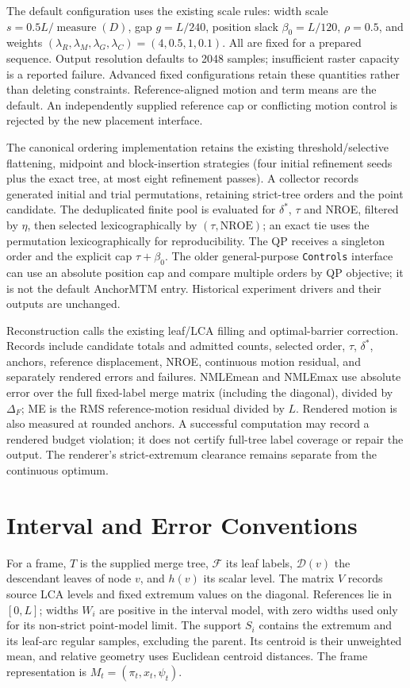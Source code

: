 \documentclass{vgtc}                %
\begin{document}
The default configuration uses the existing scale rules: width scale $s=0.5L/\operatorname{measure}(D)$, gap $g=L/240$, position slack $\beta_0=L/120$, $\rho=0.5$, and weights $(\lambda_R,\lambda_M,\lambda_G,\lambda_C)=(4,0.5,1,0.1)$. All are fixed for a prepared sequence. Output resolution defaults to 2048 samples; insufficient raster capacity is a reported failure. Advanced fixed configurations retain these quantities rather than deleting constraints. Reference-aligned motion and term means are the default. An independently supplied reference cap or conflicting motion control is rejected by the new placement interface.

The canonical ordering implementation retains the existing threshold/selective flattening, midpoint and block-insertion strategies (four initial refinement seeds plus the exact tree, at most eight refinement passes). A collector records generated initial and trial permutations, retaining strict-tree orders and the point candidate. The deduplicated finite pool is evaluated for $\delta^*$, $\tau$ and NROE, filtered by $\eta$, then selected lexicographically by $(\tau,\mathrm{NROE})$; an exact tie uses the permutation lexicographically for reproducibility. The QP receives a singleton order and the explicit cap $\tau+\beta_0$. The older general-purpose \texttt{Controls} interface can use an absolute position cap and compare multiple orders by QP objective; it is not the default AnchorMTM entry. Historical experiment drivers and their outputs are unchanged.

Reconstruction calls the existing leaf/LCA filling and optimal-barrier correction. Records include candidate totals and admitted counts, selected order, $\tau$, $\delta^*$, anchors, reference displacement, NROE, continuous motion residual, and separately rendered errors and failures. NMLEmean and NMLEmax use absolute error over the full fixed-label merge matrix (including the diagonal), divided by $\Delta_F$; ME is the RMS reference-motion residual divided by $L$. Rendered motion is also measured at rounded anchors. A successful computation may record a rendered budget violation; it does not certify full-tree label coverage or repair the output. The renderer's strict-extremum clearance remains separate from the continuous optimum.

\section{Interval and Error Conventions}\label{sec:interval}
For a frame, $T$ is the supplied merge tree, $\mathcal{F}$ its leaf labels, $\mathcal{D}(v)$ the descendant leaves of node $v$, and $h(v)$ its scalar level. The matrix $V$ records source LCA levels and fixed extremum values on the diagonal. References lie in $[0,L]$; widths $W_i$ are positive in the interval model, with zero widths used only for its non-strict point-model limit. The support $S_i$ contains the extremum and its leaf-arc regular samples, excluding the parent. Its centroid is their unweighted mean, and relative geometry uses Euclidean centroid distances. The frame representation is $M_t=(\pi_t,x_t,\psi_t)$.
\end{document}
